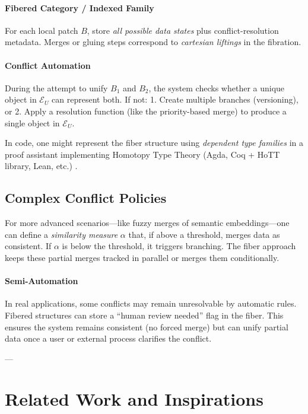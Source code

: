 \documentclass{article}
\begin{document}
\paragraph{Fibered Category / Indexed Family}  
For each local patch $B$, store \emph{all possible data states} plus conflict-resolution metadata. Merges or gluing steps correspond to \emph{cartesian liftings} in the fibration.

\paragraph{Conflict Automation}  
During the attempt to unify $B_1$ and $B_2$, the system checks whether a unique object in $\mathcal{E}_U$ can represent both. If not:
1. Create multiple branches (versioning), or
2. Apply a resolution function (like the priority-based merge) to produce a single object in $\mathcal{E}_U$.

In code, one might represent the fiber structure using \emph{dependent type families} in a proof assistant implementing Homotopy Type Theory (Agda, Coq + HoTT library, Lean, etc.) \citep{hottbook}.

\subsection{Complex Conflict Policies}
For more advanced scenarios—like fuzzy merges of semantic embeddings—one can define a \emph{similarity measure} $\alpha$ that, if above a threshold, merges data as consistent. If $\alpha$ is below the threshold, it triggers branching. The fiber approach keeps these partial merges tracked in parallel or merges them conditionally. 

\paragraph{Semi-Automation}  
In real applications, some conflicts may remain unresolvable by automatic rules. Fibered structures can store a ``human review needed'' flag in the fiber. This ensures the system remains consistent (no forced merge) but can unify partial data once a user or external process clarifies the conflict.

---

\section{Related Work and Inspirations}
\label{sec:related}
\end{document}
